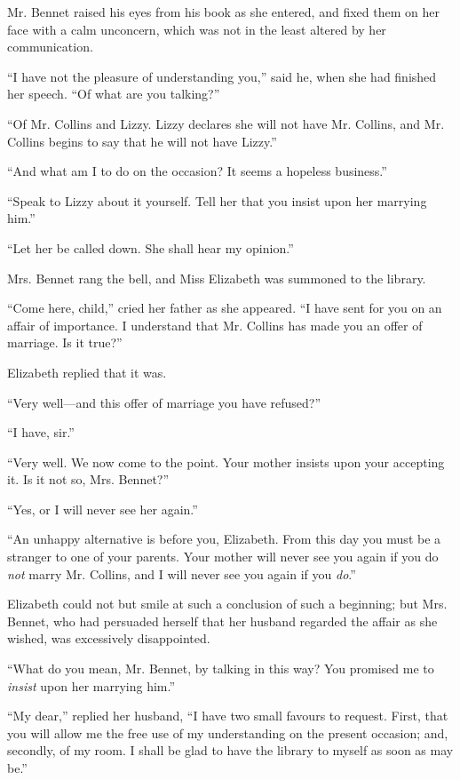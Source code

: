 \documentclass[12pt,openright]{book}
\begin{document}
Mr. Bennet raised his eyes from his book as she entered, and fixed them on her face with a calm unconcern, which was not in the least altered by her communication.

“I have not the pleasure of understanding you,” said he, when she had finished her speech. “Of what are you talking?”

“Of Mr. Collins and Lizzy. Lizzy declares she will not have Mr. Collins, and Mr. Collins begins to say that he will not have Lizzy.”

“And what am I to do on the occasion? It seems a hopeless business.”

“Speak to Lizzy about it yourself. Tell her that you insist upon her marrying him.”

“Let her be called down. She shall hear my opinion.”

Mrs. Bennet rang the bell, and Miss Elizabeth was summoned to the library.

“Come here, child,” cried her father as she appeared. “I have sent for you on an affair of importance. I understand that Mr. Collins has made you an offer of marriage. Is it true?”

Elizabeth replied that it was.

“Very well—and this offer of marriage you have refused?”

“I have, sir.”

“Very well. We now come to the point. Your mother insists upon your accepting it. Is it not so, Mrs. Bennet?”

“Yes, or I will never see her again.”

“An unhappy alternative is before you, Elizabeth. From this day you must be a stranger to one of your parents. Your mother will never see you again if you do \textit{not} marry Mr. Collins, and I will never see you again if you \textit{do}.”

Elizabeth could not but smile at such a conclusion of such a beginning; but Mrs. Bennet, who had persuaded herself that her husband regarded the affair as she wished, was excessively disappointed.

“What do you mean, Mr. Bennet, by talking in this way? You promised me to \textit{insist} upon her marrying him.”

“My dear,” replied her husband, “I have two small favours to request. First, that you will allow me the free use of my understanding on the present occasion; and, secondly, of my room. I shall be glad to have the library to myself as soon as may be.”
\end{document}
